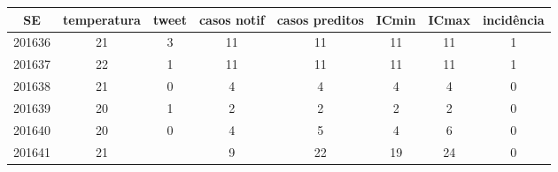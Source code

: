 \begin{tabular}{c|ccccccc}
  \hline
SE & temperatura & tweet & casos notif & casos preditos & ICmin & ICmax & incidência \\ 
  \hline
201636 & 21 & 3 & 11 & 11 & 11 & 11 & 1 \\ 
  201637 & 22 & 1 & 11 & 11 & 11 & 11 & 1 \\ 
  201638 & 21 & 0 & 4 & 4 & 4 & 4 & 0 \\ 
  201639 & 20 & 1 & 2 & 2 & 2 & 2 & 0 \\ 
  201640 & 20 & 0 & 4 & 5 & 4 & 6 & 0 \\ 
  201641 & 21 &  & 9 & 22 & 19 & 24 & 0 \\ 
   \hline
\end{tabular}
